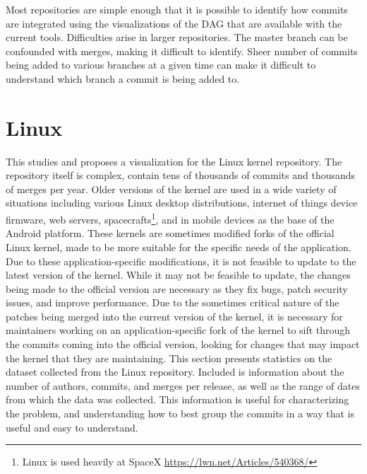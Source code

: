 Most repositories are simple enough that it is possible to identify how
commits are integrated using the visualizations of the DAG that are
available with the current tools. Difficulties arise in larger
repositories. The master branch can be confounded with \foxtrot{}
merges, making it difficult to identify. Sheer number of commits being
added to various branches at a given time can make it difficult to
understand which branch a commit is being added to.

\section{Linux}\label{sec:linux}

This \paper{} studies and proposes a visualization for the Linux kernel
repository.
The repository itself is complex, contain tens of thousands of commits
and thousands of merges per year.
Older versions of the kernel are used in a wide
variety of situations including various Linux desktop distributions,
internet of things device firmware, web servers,
spacecrafts\footnote{Linux is used heavily at SpaceX
  \url{https://lwn.net/Articles/540368/}}, and in mobile devices as the
base of the Android platform. These kernels are sometimes modified forks
of the official Linux kernel, made to be more suitable for the specific
needs of the application. Due to these application-specific
modifications, it is not feasible to update to the latest version of the
kernel. While it may not be feasible to update, the changes being made
to the official version are necessary as they fix bugs, patch security
issues, and improve performance. Due to the sometimes critical nature of
the patches being merged into the current version of the kernel, it is
necessary for maintainers working on an application-specific fork of the
kernel to sift through the commits coming into the official version,
looking for changes that may impact the kernel that they are
maintaining.
This section presents statistics on the dataset collected from the Linux
repository. Included is information about the number of authors,
commits, and merges per release, as well as the range of dates from
which the data was collected. This information is useful for
characterizing the problem, and understanding how to best group the
commits in a way that is useful and easy to understand.

